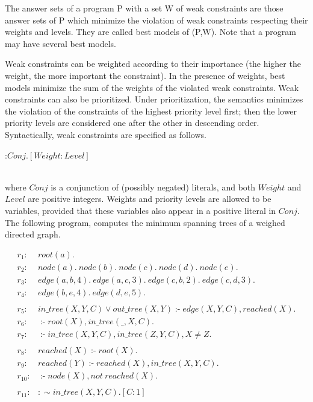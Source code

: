 \documentclass[14pt,a4paper, titlepage]{article}
\DeclareMathOperator{\leftimpl}{:-}
\begin{document}
The answer sets of a program P with a set W of weak 
constraints are those answer sets of P which minimize the 
violation of weak constraints respecting their weights and 
levels. They are called best models of (P,W). Note that a 
program may have several best models.


Weak constraints can be weighted according to their 
importance (the higher the weight, the more important the 
constraint). In the presence of weights, best models 
minimize the sum of the weights of the violated weak 
constraints. Weak constraints can also be prioritized. 
Under prioritization, the semantics minimizes the violation 
of the constraints of the highest priority level first; 
then the lower priority levels are considered one after the 
other in descending order. Syntactically, weak constraints 
are specified as follows. \\ \centerline{:$\mathit{Conj}. 
[\mathit{Weight}:\mathit{Level}]$} \\ where $\mathit{Conj}$ 
is a conjunction of (possibly negated) literals, and both 
$\mathit{Weight}$ and $\mathit{Level}$ are positive 
integers. Weights and priority levels are allowed to be 
variables, provided that these variables also appear in a 
positive literal in $\mathit{Conj}$.
The following program, computes the minimum spanning trees 
of a weighed directed graph.
\begin{exmp}
\begin{align*}
r_1\colon& \mathit{root}(a). \\
r_2\colon& \mathit{node}(a). \ \mathit{node}(b). \ 
\mathit{node}(c). \ \mathit{node}(d). \ \mathit{node}(e). \ \\
r_3\colon& \mathit{edge}(a,b,4). \ \mathit{edge}(a,c,3). \ 
\mathit{edge}(c,b,2). \ \mathit{edge}(c,d,3). \ \\
r_4\colon& \mathit{edge}(b,e,4). \ \mathit{edge}(d,e,5). \ \\
\\
r_5 \colon & \mathit{in\_tree}(X,Y,C) \vee 
\mathit{out\_tree}(X,Y) \leftimpl \mathit{edge}(X,Y,C), 
\mathit{reached}(X). \\
r_6\colon& \leftimpl \mathit{root}(X), \mathit{in\_tree}
(\_,X,C).\\
r_7\colon& \leftimpl \mathit{in\_tree}(X,Y,C), 
\mathit{in\_tree}(Z,Y,C), X \neq Z. \\
\\
r_{8}\colon& \mathit{reached}(X) \leftimpl \mathit{root}
(X). \\
r_{9}\colon& \mathit{reached}(Y) \leftimpl 
\mathit{reached}(X), \mathit{in\_tree}(X,Y,C). \\
r_{10}\colon& \leftimpl \mathit{node}(X), \mathit{not} \ 
\mathit{reached}(X). \\
\\
r_{11}\colon&\mathit{ : \sim in\_tree}(X,Y,C). [C:1]
\end{align*}
\end{exmp}
\end{document}

